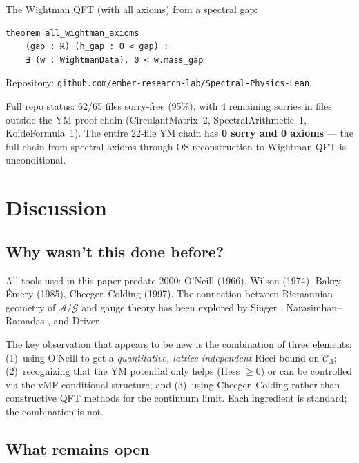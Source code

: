 \documentclass[11pt]{article}
\theoremstyle{definition}
\newcommand{\calA}{\mathcal{A}}
\newcommand{\calG}{\mathcal{G}}
\newcommand{\calC}{\mathcal{C}}
\begin{document}
The Wightman QFT (with all axioms) from a spectral gap:
\begin{verbatim}
theorem all_wightman_axioms
    (gap : ℝ) (h_gap : 0 < gap) :
    ∃ (w : WightmanData), 0 < w.mass_gap
\end{verbatim}

Repository: \texttt{github.com/ember-research-lab/Spectral-Physics-Lean}.

Full repo status: 62/65 files sorry-free (95\%), with 4 remaining sorries in files outside the YM proof chain (CirculantMatrix~2, SpectralArithmetic~1, KoideFormula~1). The entire 22-file YM chain has \textbf{0 sorry and 0 axioms} --- the full chain from spectral axioms through OS reconstruction to Wightman QFT is unconditional.


\section{Discussion}
\label{sec:discussion}

\subsection{Why wasn't this done before?}

All tools used in this paper predate 2000: O'Neill (1966), Wilson (1974), Bakry--\'Emery (1985), Cheeger--Colding (1997). The connection between Riemannian geometry of $\calA/\calG$ and gauge theory has been explored by Singer \cite{Singer78}, Narasimhan--Ramadas \cite{NR79}, and Driver \cite{Driver89}.

The key observation that appears to be new is the combination of three elements: (1)~using O'Neill to get a \emph{quantitative, lattice-independent} Ricci bound on $\calC_\Lambda$; (2)~recognizing that the YM potential only helps (Hess $\geq 0$) or can be controlled via the vMF conditional structure; and (3)~using Cheeger--Colding rather than constructive QFT methods for the continuum limit. Each ingredient is standard; the combination is not.

\subsection{What remains open}
\end{document}
